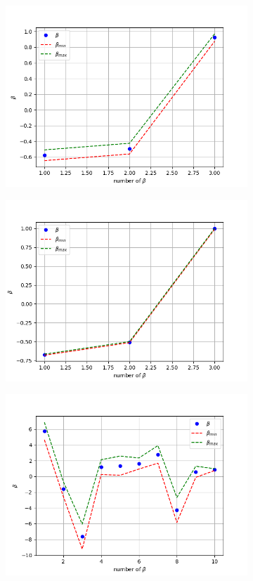 
\begin{figure}[!ht]
\begin{subfigure}{\textwidth}
  \centering
  \includegraphics[width=0.5\linewidth]{images/betas/fake_linear_beta_p01_n10.png}
\end{subfigure}
\begin{subfigure}{\textwidth}
  \centering
\includegraphics[width=0.5\linewidth]{images/betas/fake_linear_beta_p01_n100.png}
\end{subfigure}
\begin{subfigure}{\textwidth}
  \centering
\includegraphics[width=0.5\linewidth]{images/betas/fake_linear_beta_p03_n10.png}
\end{subfigure}
\begin{subfigure}{\textwidth}

\end{subfigure}
\end{figure}
